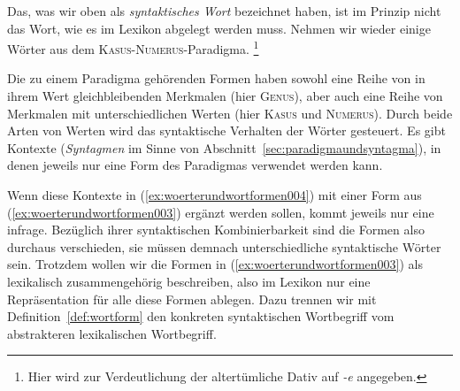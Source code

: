 Das, was wir oben als \textit{syntaktisches Wort} bezeichnet haben, ist im Prinzip nicht das Wort, wie es im Lexikon abgelegt werden muss.
Nehmen wir wieder einige Wörter aus dem \textsc{Kasus}-\textsc{Numerus}-Paradigma.%
\footnote{Hier wird zur Verdeutlichung der altertümliche Dativ auf \textit{-e} angegeben.}

\begin{exe}
  \ex\label{ex:woerterundwortformen003}
  \begin{xlist}
  \end{xlist}
\end{exe}

Die zu einem Paradigma gehörenden Formen haben sowohl eine Reihe von in ihrem Wert gleichbleibenden Merkmalen (hier \textsc{Genus}), aber auch eine Reihe von Merkmalen mit unterschiedlichen Werten (hier \textsc{Kasus} und \textsc{Numerus}).
Durch beide Arten von Werten wird das syntaktische Verhalten der Wörter gesteuert.
Es gibt Kontexte (\textit{Syntagmen} im Sinne von Abschnitt~\ref{sec:paradigmaundsyntagma}), in denen jeweils nur eine Form des Paradigmas verwendet werden kann.

\begin{exe}
  \ex\label{ex:woerterundwortformen004}
  \begin{xlist}
  \end{xlist}
\end{exe}

Wenn diese Kontexte in (\ref{ex:woerterundwortformen004}) mit einer Form aus (\ref{ex:woerterundwortformen003}) ergänzt werden sollen, kommt jeweils nur eine infrage.
Bezüglich ihrer syntaktischen Kombinierbarkeit sind die Formen also durchaus verschieden, sie müssen demnach unterschiedliche syntaktische Wörter sein.
Trotzdem wollen wir die Formen in (\ref{ex:woerterundwortformen003}) als lexikalisch zusammengehörig beschreiben, also im Lexikon nur eine Repräsentation für alle diese Formen ablegen.
Dazu trennen wir mit Definition~\ref{def:wortform} den konkreten syntaktischen Wortbegriff vom abstrakteren lexikalischen Wortbegriff.

